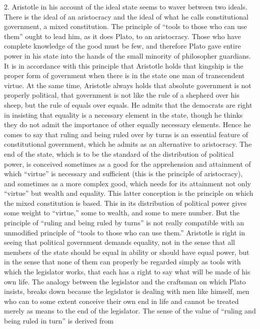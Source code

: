 2. Aristotle in his account of the ideal state seems to waver between two
ideals. There is the ideal of an aristocracy and the ideal of what he
calls constitutional government, a mixed constitution. The principle of
``tools to those who can use them'' ought to lead him, as it does Plato, to
an aristocracy. Those who have complete knowledge of the good must be few,
and therefore Plato gave entire power in his state into the hands of the
small minority of philosopher guardians. It is in accordance with this
principle that Aristotle holds that kingship is the proper form of
government when there is in the state one man of transcendent virtue. At
the same time, Aristotle always holds that absolute government is not
properly political, that government is not like the rule of a shepherd
over his sheep, but the rule of equals over equals. He admits that the
democrats are right in insisting that equality is a necessary element in
the state, though he thinks they do not admit the importance of other
equally necessary elements. Hence he comes to say that ruling and being
ruled over by turns is an essential feature of constitutional government,
which he admits as an alternative to aristocracy. The end of the state,
which is to be the standard of the distribution of political power, is
conceived sometimes as a good for the apprehension and attainment of which
``virtue'' is necessary and sufficient (this is the principle of
aristocracy), and sometimes as a more complex good, which needs for its
attainment not only ``virtue'' but wealth and equality. This latter
conception is the principle on which the mixed constitution is based. This
in its distribution of political power gives some weight to ``virtue,'' some
to wealth, and some to mere number. But the principle of ``ruling and being
ruled by turns'' is not really compatible with an unmodified principle of
``tools to those who can use them.'' Aristotle is right in seeing that
political government demands equality, not in the sense that all members
of the state should be equal in ability or should have equal power, but in
the sense that none of them can properly be regarded simply as tools with
which the legislator works, that each has a right to say what will be made
of his own life. The analogy between the legislator and the craftsman on
which Plato insists, breaks down because the legislator is dealing with
men like himself, men who can to some extent conceive their own end in
life and cannot be treated merely as means to the end of the legislator.
The sense of the value of ``ruling and being ruled in turn'' is derived from
